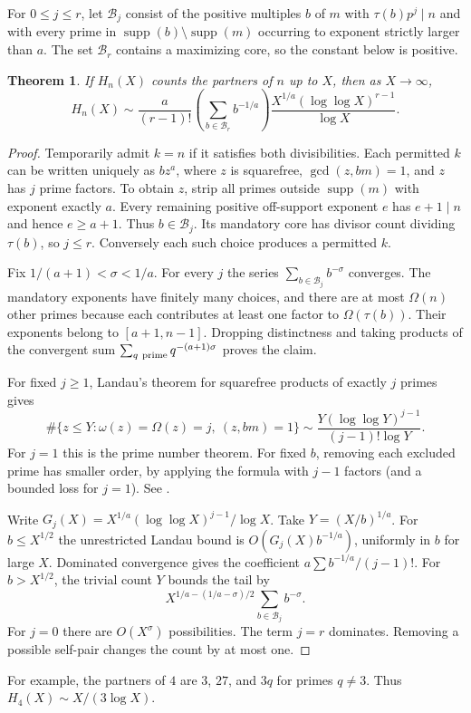\documentclass[11pt]{article}
\newtheorem{theorem}{Theorem}[section]
\newcommand{\supp}{\operatorname{supp}}
\begin{document}
For $0\le j\le r$, let $\mathcal B_j$ consist of the positive multiples $b$ of $m$ with $\tau(b)p^j\mid n$ and with every prime in $\supp(b)\setminus\supp(m)$ occurring to exponent strictly larger than $a$. The set $\mathcal B_r$ contains a maximizing core, so the constant below is positive.
\begin{theorem}\label{asym}
If $H_n(X)$ counts the partners of $n$ up to $X$, then as $X\to\infty$,
\[
 H_n(X)\sim
 \frac{a}{(r-1)!}\left(\sum_{b\in\mathcal B_r}b^{-1/a}\right)
 \frac{X^{1/a}(\log\log X)^{r-1}}{\log X}.
\]
\end{theorem}
\begin{proof}
Temporarily admit $k=n$ if it satisfies both divisibilities. Each permitted $k$ can be written uniquely as $bz^a$, where $z$ is squarefree, $\gcd(z,bm)=1$, and $z$ has $j$ prime factors. To obtain $z$, strip all primes outside $\supp(m)$ with exponent exactly $a$. Every remaining positive off-support exponent $e$ has $e+1\mid n$ and hence $e\ge a+1$. Thus $b\in\mathcal B_j$. Its mandatory core has divisor count dividing $\tau(b)$, so $j\le r$. Conversely each such choice produces a permitted $k$.

Fix $1/(a+1)<\sigma<1/a$. For every $j$ the series $\sum_{b\in\mathcal B_j} b^{-\sigma}$ converges. The mandatory exponents have finitely many choices, and there are at most $\Omega(n)$ other primes because each contributes at least one factor to $\Omega(\tau(b))$. Their exponents belong to $[a+1,n-1]$. Dropping distinctness and taking products of the convergent sum $\sum_{q\ {\rm prime}}q^{-(a+1)\sigma}$ proves the claim.

For fixed $j\ge1$, Landau's theorem for squarefree products of exactly $j$ primes gives
\[
 \#\{z\le Y:\omega(z)=\Omega(z)=j,\ (z,bm)=1\}
 \sim \frac{Y(\log\log Y)^{j-1}}{(j-1)!\log Y}.
\]
For $j=1$ this is the prime number theorem. For fixed $b$, removing each excluded prime has smaller order, by applying the formula with $j-1$ factors (and a bounded loss for $j=1$). See \cite{landau}.

Write $G_j(X)=X^{1/a}(\log\log X)^{j-1}/\log X$. Take $Y=(X/b)^{1/a}$. For $b\le X^{1/2}$ the unrestricted Landau bound is $O(G_j(X)b^{-1/a})$, uniformly in $b$ for large $X$. Dominated convergence gives the coefficient $a\sum b^{-1/a}/(j-1)!$. For $b>X^{1/2}$, the trivial count $Y$ bounds the tail by
\[
 X^{1/a-(1/a-\sigma)/2}\sum_{b\in\mathcal B_j} b^{-\sigma}.
\]
For $j=0$ there are $O(X^\sigma)$ possibilities. The term $j=r$ dominates. Removing a possible self-pair changes the count by at most one.
\end{proof}
For example, the partners of $4$ are $3$, $27$, and $3q$ for primes $q\ne3$. Thus $H_4(X)\sim X/(3\log X)$.
\end{document}
